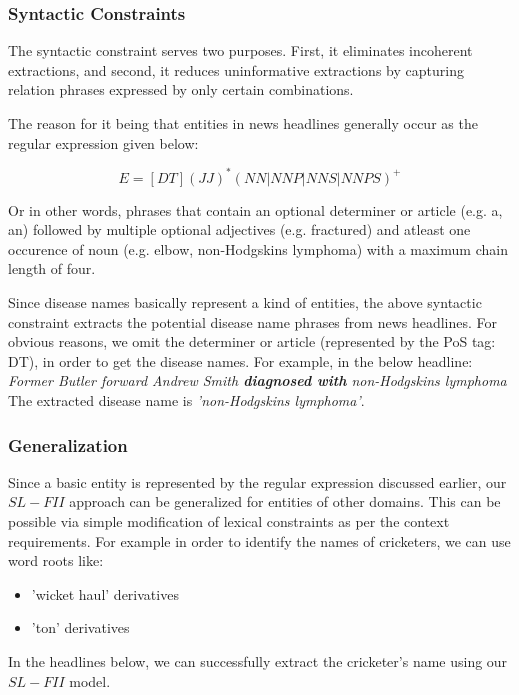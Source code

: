 \documentclass{article}
\begin{document}
\subsubsection{Syntactic Constraints}

The syntactic constraint serves two purposes. First, it eliminates incoherent extractions, and second, it
reduces uninformative extractions by capturing relation phrases
expressed by only certain combinations. 

The reason for it being that entities in news headlines generally occur as the regular expression given below:

\[E = [DT](JJ)^*(NN|NNP|NNS|NNPS)^+\]

Or in other words, phrases that contain an optional determiner or article (e.g. a, an)  followed by multiple optional adjectives (e.g. fractured) and atleast one occurence of noun (e.g. elbow, non-Hodgskins lymphoma) with a maximum chain length of four. 
 
Since disease names basically represent a kind of entities, the above syntactic constraint extracts the potential disease name phrases from news headlines. For obvious reasons, we omit the determiner or article (represented by the PoS tag: DT), in order to get the disease names. For example, in the below headline: \\

\textit{Former Butler forward Andrew Smith \textbf{diagnosed with} non-Hodgskins lymphoma 
}\\

The extracted disease name is \textit{'non-Hodgskins lymphoma'}.


\subsubsection{Generalization}
Since a basic entity is represented by the regular expression discussed earlier, our $SL-FII$ approach can be generalized for entities of other domains. This can be possible via simple modification of lexical constraints as per the context requirements. For example in order to identify the names of cricketers, we can use word roots like:

\begin{itemize}
\item 'wicket haul' derivatives
\item 'ton' derivatives
\end{itemize}

In the headlines below, we can successfully extract the cricketer's name using our $SL-FII$ model.\\
\end{document}
